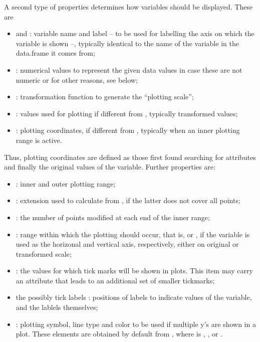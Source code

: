 \documentclass[11pt]{article}\usepackage[]{graphicx}\usepackage[]{color}
\begin{document}
A second type of properties determines how variables should be displayed.
These are
\begin{itemize}
\item
   and : variable name and label --  
  to be used for labelling the axis on which the variable is shown --, 
  typically identical to the name of the variable
  in the data.frame it comes from;
\item
  : numerical values to represent the given data values in
  case these are not numeric or for other reasons, see  below;
\item
  : transformation function to generate the ``plotting scale'';    
\item
  : values used for plotting if different from , 
  typically transformed values;
\item
  : plotting coordinates, if different from ,
  typically when an inner plotting range is active.
\end{itemize}
Thus, plotting coordinates are defined as those first found searching for attributes  and finally 
the original values of the variable. 
Further properties are:
\begin{itemize}  
\item
  : inner and outer plotting range;
\item
  : extension used to calculate 
  from , if the latter does not cover all points;
\item 
  : the number of points modified at each end of the inner range;
\item
  : range within which the plotting should occur, that is,    or , if the variable is used as the horizonal and
  vertical axis, respectively, either on original or transformed scale;
\item
  : the values for which tick marks will be shown in plots.
  This item may carry an attribute  that leads to an additional
  set of smaller tickmarks;
\item
   the possibly tick labels :
  positions of labels to indicate values of the variable, and the lablels
  themselves;
\item
  : plotting symbol, line type and color to be used 
  if multiple y's are shown in a plot.
  These elements are obtained by default from
  , where  is , , or
  .
\end{itemize}
\end{document}
